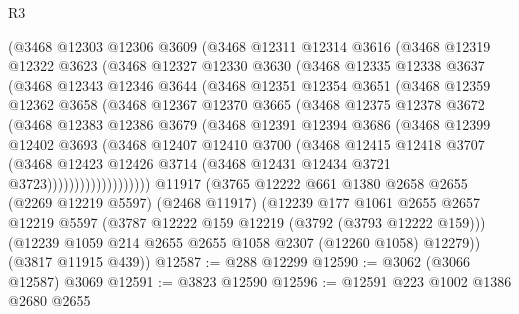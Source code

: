 \begin{lexlean}{R3}
\begin{coremodule}
        (@3468
          @12303
          @12306
          @3609
          (@3468
            @12311
            @12314
            @3616
            (@3468
              @12319
              @12322
              @3623
              (@3468
                @12327
                @12330
                @3630
                (@3468
                  @12335
                  @12338
                  @3637
                  (@3468
                    @12343
                    @12346
                    @3644
                    (@3468
                      @12351
                      @12354
                      @3651
                      (@3468
                        @12359
                        @12362
                        @3658
                        (@3468
                          @12367
                          @12370
                          @3665
                          (@3468
                            @12375
                            @12378
                            @3672
                            (@3468
                              @12383
                              @12386
                              @3679
                              (@3468
                                @12391
                                @12394
                                @3686
                                (@3468
                                  @12399
                                  @12402
                                  @3693
                                  (@3468
                                    @12407
                                    @12410
                                    @3700
                                    (@3468
                                      @12415
                                      @12418
                                      @3707
                                      (@3468
                                        @12423
                                        @12426
                                        @3714
                                        (@3468 @12431 @12434 @3721 @3723)))))))))))))))))))
    @11917
    (@3765
      @12222
      @661
      @1380
      @2658
      @2655
      (@2269 @12219 @5597)
      (@2468 @11917)
      (@12239
        @177
        @1061
        @2655
        @2657
        @12219
        @5597
        (@3787 @12222 @159 @12219 (@3792 (@3793 @12222 @159)))
        (@12239 @1059 @214 @2655 @2655 @1058 @2307 (@12260 @1058) @12279))
      (@3817 @11915 @439))
@12587 := @288 @12299
@12590 := @3062 (@3066 @12587) @3069
@12591 := @3823 @12590
@12596 := @12591 @223 @1002 @1386 @2680 @2655

\end{coremodule}
\end{lexlean}
